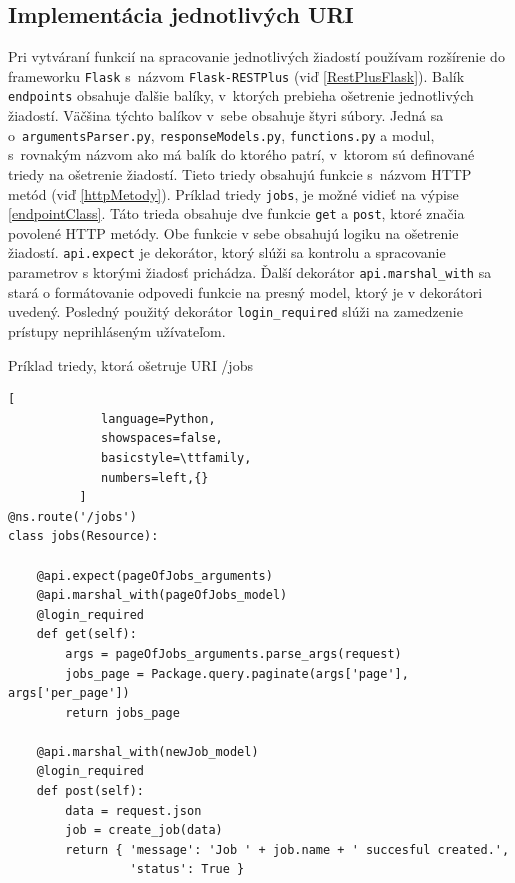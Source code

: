 \documentclass[slovak]{fitthesis}
\begin{document}
\subsection{Implementácia jednotlivých URI}
Pri vytváraní funkcií na spracovanie jednotlivých žiadostí používam rozšírenie do frameworku \texttt{Flask} s~názvom \texttt{Flask-RESTPlus} (viď \ref{RestPlusFlask}). Balík \texttt{endpoints} obsahuje ďalšie balíky, v~ktorých prebieha ošetrenie jednotlivých žiadostí. Väčšina týchto balíkov v~sebe obsahuje štyri súbory. Jedná sa o~\texttt{argumentsParser.py}, \texttt{responseModels.py}, \texttt{functions.py} a modul, s~rovnakým názvom ako má balík do ktorého patrí, v~ktorom sú definované triedy na ošetrenie žiadostí. Tieto triedy obsahujú funkcie s~názvom HTTP metód (viď \ref{httpMetody}). Príklad triedy \texttt{jobs}, je možné vidieť na výpise \ref{endpointClass}. Táto trieda obsahuje dve funkcie \texttt{get} a \texttt{post}, ktoré značia povolené HTTP metódy. Obe funkcie v sebe obsahujú logiku na ošetrenie žiadostí. \texttt{api.expect} je dekorátor, ktorý slúži sa kontrolu a spracovanie parametrov s ktorými žiadosť prichádza. Ďalší dekorátor \texttt{api.marshal\_with} sa stará o formátovanie odpovedi funkcie na presný model, ktorý je v dekorátori uvedený. Posledný použitý dekorátor \texttt{login\_required} slúži na zamedzenie prístupy neprihláseným užívateľom.
\begin{algorithm}
  \caption{Príklad triedy, ktorá ošetruje URI /jobs}
  \label{endpointClass}
  \begin{lstlisting}[
             language=Python,
             showspaces=false,
             basicstyle=\ttfamily,
             numbers=left,{}
          ]
@ns.route('/jobs')
class jobs(Resource):

    @api.expect(pageOfJobs_arguments)
    @api.marshal_with(pageOfJobs_model)
    @login_required
    def get(self):
        args = pageOfJobs_arguments.parse_args(request)
        jobs_page = Package.query.paginate(args['page'], args['per_page'])
        return jobs_page

    @api.marshal_with(newJob_model)
    @login_required
    def post(self):
        data = request.json
        job = create_job(data)
        return { 'message': 'Job ' + job.name + ' succesful created.',
                 'status': True }
  \end{lstlisting}
\end{algorithm}
\end{document}
